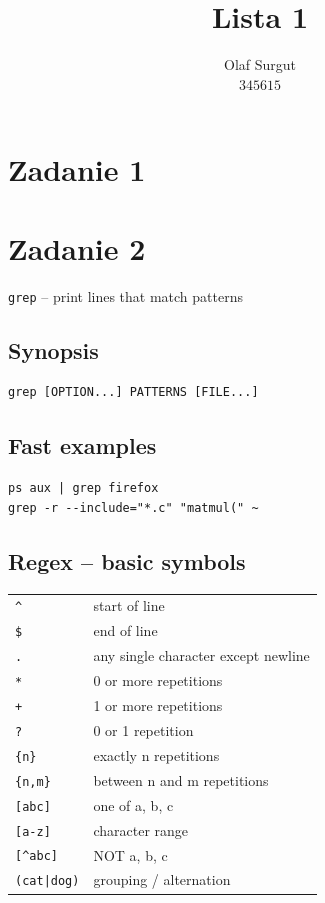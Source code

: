 \documentclass[11pt]{article}
\title{\vspace*{-0.75in}\textbf{Lista 1}}
\author{Olaf Surgut \\ $345615$}
\begin{document}
\pagestyle{empty}
\maketitle
\thispagestyle{empty}

\section*{Zadanie 1}

\section*{Zadanie 2}

\verb|grep| -- print lines that match patterns

\subsection*{Synopsis}

\begin{verbatim}
grep [OPTION...] PATTERNS [FILE...]

\end{verbatim}

\subsection*{Fast examples}

\begin{verbatim}
ps aux | grep firefox
grep -r --include="*.c" "matmul(" ~
\end{verbatim}

\subsection*{Regex -- basic symbols}

\begin{tabular}{ll}
\verb|^| & start of line \\
\verb|$| & end of line \\
\verb|.| & any single character except newline \\
\verb|*| & 0 or more repetitions \\
\verb|+| & 1 or more repetitions \\
\verb|?| & 0 or 1 repetition \\
\verb|{n}| & exactly n repetitions \\
\verb|{n,m}| & between n and m repetitions \\
\verb|[abc]| & one of a, b, c \\
\verb|[a-z]| & character range \\
\verb|[^abc]| & NOT a, b, c \\
\verb!(cat|dog)! & grouping / alternation \\
\end{tabular}
\end{document}
